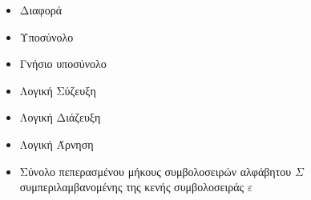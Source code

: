 \begin{itemize}
	\item{ Διαφορά}
	\item{\makebox[2cm]{$\subseteq$ \hfill} Υποσύνολο}
	\item{\makebox[2cm]{$\subset$ \hfill} Γνήσιο υποσύνολο}
	\item{\makebox[2cm]{$\land$ \hfill} Λογική Σύζευξη}
	\item{\makebox[2cm]{$\lor$ \hfill} Λογική Διάζευξη}
	\item{\makebox[2cm]{$\neg{}$ \hfill} Λογική Άρνηση}
	\item{\makebox[2cm]{$\Sigma^*$ \hfill} Σύνολο πεπερασμένου μήκους συμβολοσειρών αλφάβητου $\Sigma$\\
		 \makebox[2.14cm]{\hfill}συμπεριλαμβανομένης της κενής συμβολοσειράς $ε$}
\end{itemize}

\clearpage